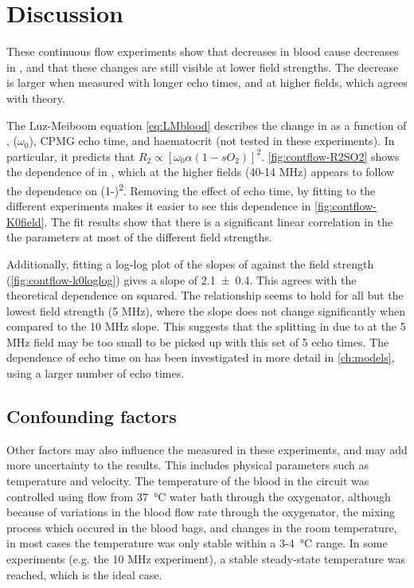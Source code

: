 \section{Discussion}
These continuous flow experiments show that decreases in blood \SOtwo cause decreases in \Ttwo, and that these changes are still visible at lower field strengths.
The \Ttwo decrease is larger when measured with longer echo times, and at higher fields, which agrees with theory.

The Luz-Meiboom equation \autoref{eq:LMblood} describes the change in \Ttwo as a function of \SOtwo, \Bzero ($\omega_0$), CPMG echo time, and haematocrit (not tested in these experiments).
In particular, it predicts that $R_2 \propto \left[\omega_0\alpha(1-sO_2)\right]^2$.
\autoref{fig:contflow-R2SO2} shows the dependence of \Rtwo in \SOtwo, which at the higher fields (40-14 MHz) appears to follow the dependence on (1-\SOtwo)\textsuperscript{2}.
Removing the effect of echo time, by fitting \Kzero to the different experiments makes it easier to see this dependence in \autoref{fig:contflow-K0field}.
The fit results show that there is a significant linear correlation in the the parameters at most of the different field strengths.

Additionally, fitting a log-log plot of the slopes of \Kzero against the field strength \Bzero (\autoref{fig:contflow-k0loglog}) gives a slope of \num{2.1\pm0.4}.
This agrees with the theoretical dependence on \Bzero squared.
The relationship seems to hold for all but the lowest field strength (5 MHz), where the slope does not change significantly when compared to the 10 MHz slope.
This suggests that the splitting  in \Ttwo due to \SOtwo at the 5 MHz field may be too small to be picked up with this set of 5 echo times.
The dependence of echo time on \Ttwo has been investigated in more detail in \autoref{ch:models}, using a larger number of echo times.

\subsection{Confounding factors}

Other factors may also influence the \Ttwo measured in these experiments, and may add more uncertainty to the results.
This includes physical parameters such as temperature and velocity.
The temperature of the blood in the circuit was controlled using flow from \SI{37}{\celsius} water bath through the oxygenator, although because of variations in the blood flow rate through the oxygenator, the mixing process which occured in the blood bags, and changes in the room temperature, in most cases the temperature was only stable within a \num{3}-\SI{4}{\celsius} range.
In some experiments (e.g. the 10 MHz experiment), a stable steady-state temperature was reached, which is the ideal case.

